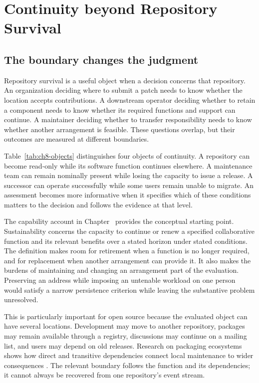 \section{Continuity beyond Repository Survival}
\label{sec:ch8-continuity}

\subsection{The boundary changes the judgment}
Repository survival is a useful object when a decision concerns that repository. An organization deciding where to submit a patch needs to know whether the location accepts contributions. A downstream operator deciding whether to retain a component needs to know whether its required functions and support can continue. A maintainer deciding whether to transfer responsibility needs to know whether another arrangement is feasible. These questions overlap, but their outcomes are measured at different boundaries.

Table~\ref{tab:ch8-objects} distinguishes four objects of continuity. A repository can become read-only while its software function continues elsewhere. A maintenance team can remain nominally present while losing the capacity to issue a release. A successor can operate successfully while some users remain unable to migrate. An assessment becomes more informative when it specifies which of these conditions matters to the decision and follows the evidence at that level.



The capability account in Chapter~ provides the conceptual starting point. Sustainability concerns the capacity to continue or renew a specified collaborative function and its relevant benefits over a stated horizon under stated conditions. The definition makes room for retirement when a function is no longer required, and for replacement when another arrangement can provide it. It also makes the burdens of maintaining and changing an arrangement part of the evaluation. Preserving an address while imposing an untenable workload on one person would satisfy a narrow persistence criterion while leaving the substantive problem unresolved.

This is particularly important for open source because the evaluated object can have several locations. Development may move to another repository, packages may remain available through a registry, discussions may continue on a mailing list, and users may depend on old releases. Research on packaging ecosystems shows how direct and transitive dependencies connect local maintenance to wider consequences \citep{decan2019}. The relevant boundary follows the function and its dependencies; it cannot always be recovered from one repository's event stream.


